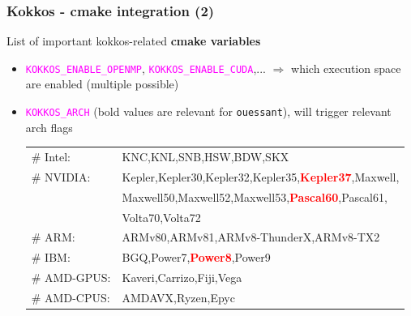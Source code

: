 \begin{frame}[fragile=singleslide]
  \frametitle{Kokkos - cmake integration (2)}

  {\large List of important kokkos-related {\bf cmake variables}}
  \begin{itemize}
  \item \textcolor{magenta}{\texttt{KOKKOS\_ENABLE\_OPENMP}}, \textcolor{magenta}{\texttt{KOKKOS\_ENABLE\_CUDA}},... $\Rightarrow$ which execution space are enabled (multiple possible)
  \item \textcolor{magenta}{\texttt{KOKKOS\_ARCH}} (bold values are relevant for \texttt{ouessant}), will trigger relevant arch flags
    \begin{tabular}{ll}
      \# Intel:    & KNC,KNL,SNB,HSW,BDW,SKX\\
    \# NVIDIA:   & Kepler,Kepler30,Kepler32,Kepler35,\textcolor{red}{\bf Kepler37},Maxwell,\\
      & Maxwell50,Maxwell52,Maxwell53,\textcolor{red}{\bf Pascal60},Pascal61,\\
      & Volta70,Volta72\\
    \# ARM:      &ARMv80,ARMv81,ARMv8-ThunderX,ARMv8-TX2\\
    \# IBM:      &BGQ,Power7,\textcolor{red}{\bf Power8},Power9\\
    \# AMD-GPUS: &Kaveri,Carrizo,Fiji,Vega\\
    \# AMD-CPUS: &AMDAVX,Ryzen,Epyc\\
    \end{tabular}
  \end{itemize}

\end{frame}

